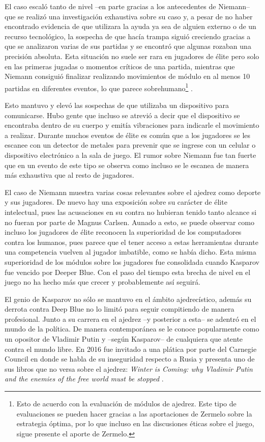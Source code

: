 \documentclass[twoside,openright,12pt,a4paper,spanish]{book}
\begin{document}
El caso escaló tanto de nivel --en parte gracias a los antecedentes de Niemann-- que se realizó una investigación exhaustiva sobre su caso y, a pesar de no haber encontrado evidencia de que utilizara la ayuda ya sea de alguien externo o de un recurso tecnológico, la sospecha de que hacía trampa siguió creciendo gracias a que se analizaron varias de sus partidas y se encontr\'o que algunas rozaban una precisión absoluta. Esta situaci\'on no suele ser rara en jugadores de élite pero solo en las primeras jugadas o momentos cr\'iticos de una partida, mientras que Niemann consiguió finalizar realizando movimientos de módulo en al menos 10 partidas en diferentes eventos, lo que parece sobrehumano\footnote{Esto de acuerdo con la evaluación de módulos de ajedrez. Este tipo de evaluaciones se pueden hacer gracias a las aportaciones de Zermelo sobre la estrategia óptima, por lo que incluso en las discusiones éticas sobre el juego, sigue presente el aporte de Zermelo.} \cite{hansniemannnumbers}.

Esto mantuvo y elevó las sospechas de que utilizaba un dispositivo para comunicarse. Hubo gente que incluso se atrevió a decir que el dispositivo se encontraba dentro de su cuerpo y emitía vibraciones para indicarle el movimiento a realizar. Durante muchos eventos de élite es común que a los jugadores se les escanee con un detector de metales para prevenir que se ingrese con un celular o dispositivo electrónico a la sala de juego. El rumor sobre Niemann fue tan fuerte que en un evento de este tipo se observa como incluso se le escanea de manera más exhaustiva que al resto de jugadores.

El caso de Niemann muestra varias cosas relevantes sobre el ajedrez como deporte y sus jugadores. De nuevo hay una exposición sobre su carácter de élite intelectual, pues las acusaciones en su contra no hubieran tenido tanto alcance si no fueran por parte de Magnus Carlsen. Aunado a esto, se puede observar como incluso los jugadores de élite reconocen la superioridad de los computadores contra los humanos, pues parece que el tener acceso a estas herramientas durante una competencia vuelven al jugador imbatible, como se había dicho. Esta misma superioridad de los módulos sobre los jugadores fue consolidada cuando Kasparov fue vencido por Deeper Blue. Con el paso del tiempo esta brecha de nivel en el juego no ha hecho más que crecer y probablemente así seguirá.

El genio de Kasparov no sólo se mantuvo en el ámbito ajedrecístico, además su derrota contra Deep Blue no lo limitó para seguir compitiendo de manera profesional. Junto a su carrera en el ajedrez --y posterior a esta-- se adentró en el mundo de la política. De manera contemporánea se le conoce popularmente como un opositor de Vladimir Putin y --según Kasparov-- de cualquiera que atente contra el mundo libre. En 2016 fue invitado a una plática por parte del Carnegie Council en donde se habla de su inseguridad respecto a Rusia y presenta uno de sus libros que no versa sobre el ajedrez: \textit{Winter is Coming: why Vladimir Putin and the enemies of the free world must be stopped} \citeyear{kasparov2015winter}.
\end{document}
